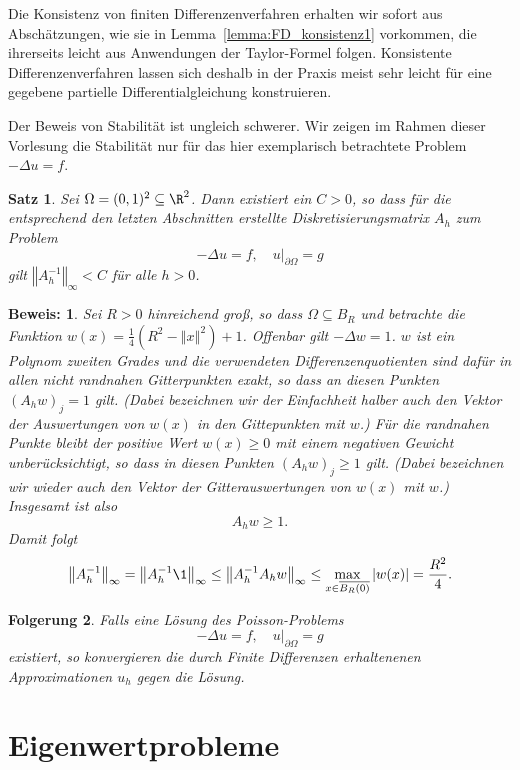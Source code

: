 \documentclass[
]{mycourse}
\theoremstyle{mythm}
\newtheorem{theorem}{Satz}[chapter]
\newtheorem{korollar}[theorem]{Folgerung}
\theoremstyle{break}
\newtheorem*{beweis}{Beweis:}
\newcommand{\norm}[1]{\left\Vert#1\right\Vert}		%
\begin{document}
Die Konsistenz von finiten Differenzenverfahren erhalten wir sofort aus Abschätzungen, wie sie in Lemma~\ref{lemma:FD_konsistenz1}
vorkommen, die ihrerseits leicht aus Anwendungen der Taylor-Formel folgen. Konsistente Differenzenverfahren
lassen sich deshalb in der Praxis meist sehr leicht für eine gegebene partielle Differentialgleichung konstruieren. 

Der Beweis von Stabilität ist ungleich schwerer. %
Wir zeigen im Rahmen dieser Vorlesung die Stabilität nur für das hier exemplarisch betrachtete 
Problem $-\Delta u=f$.

\begin{theorem}
Sei $\Omega=(0,1)^2\subseteq \R^2$. Dann existiert ein $C>0$, so dass für die entsprechend den
letzten Abschnitten erstellte Diskretisierungsmatrix $A_h$ zum Problem 
\[
-\Delta u=f, \quad u|_{\partial \Omega}=g
\]
gilt $\norm{A_h^{-1}}_\infty < C$ für alle $h>0$. 
\end{theorem}
\begin{beweis}
Sei $R>0$ hinreichend groß, so dass $\Omega\subseteq B_{R}$ und betrachte die Funktion $w(x)=\frac{1}{4}\left( R^2 -\norm{x}^2 \right)+1$. 
Offenbar gilt $-\Delta w=1$. $w$ ist ein Polynom zweiten Grades und die verwendeten Differenzenquotienten sind dafür in allen nicht randnahen Gitterpunkten 
exakt, so dass an diesen Punkten $(A_h w)_j=1$ gilt. (Dabei bezeichnen wir der 
Einfachheit halber auch den Vektor der Auswertungen von $w(x)$ in den Gittepunkten mit $w$.) Für die randnahen Punkte bleibt der positive Wert $w(x)\geq 0$ mit einem negativen Gewicht unberücksichtigt, so dass in diesen Punkten $(A_h w)_j\geq 1$ gilt. (Dabei bezeichnen wir wieder auch den Vektor der Gitterauswertungen von $w(x)$ mit $w$.)
Insgesamt ist also 
\[
A_h w\geq 1.
\]
Damit folgt
\[
\norm{A_h^{-1}}_\infty= \norm{A_h^{-1} \1}_\infty\leq \norm{A_h^{-1} A_h w}_\infty \leq \max_{x\in \overline{B_R(0)}} |w(x)|= \frac{R^2}{4}.
\]
\end{beweis}

\begin{korollar}
Falls eine Lösung des Poisson-Problems
\[
-\Delta u=f, \quad u|_{\partial \Omega}=g
\]
existiert, so konvergieren die durch Finite Differenzen erhaltenenen Approximationen $u_h$ gegen die Lösung. 
\end{korollar}




\chapter{Eigenwertprobleme}
\end{document}
